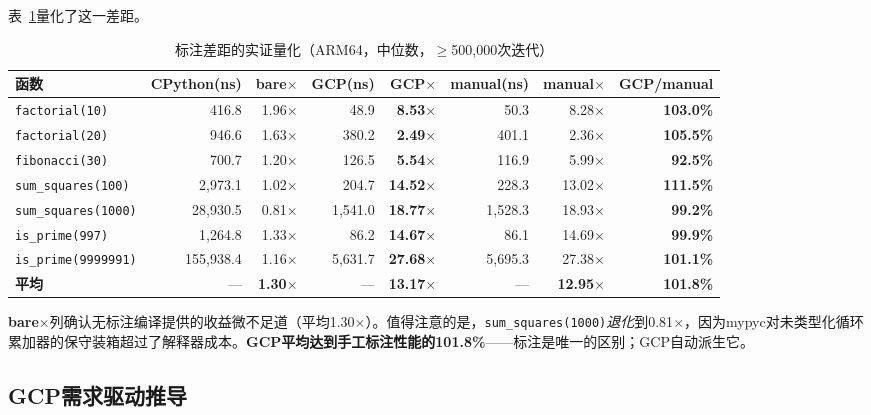 \documentclass[UTF8]{article}
\begin{document}
表~\ref{tab:annotation-gap}量化了这一差距。

\begin{table}[h]
\centering
\caption{标注差距的实证量化（ARM64，中位数，$\geq$500,000次迭代）}
\label{tab:annotation-gap}
\begin{tabular}{lrrrrrrr}
\toprule
\textbf{函数} & \textbf{CPython(ns)} & \textbf{bare$\times$} & \textbf{GCP(ns)} & \textbf{GCP$\times$} & \textbf{manual(ns)} & \textbf{manual$\times$} & \textbf{GCP/manual} \\
\midrule
\texttt{factorial(10)}    & 416.8   & 1.96$\times$ & 48.9   & \textbf{8.53$\times$}  & 50.3   & 8.28$\times$  & \textbf{103.0\%} \\
\texttt{factorial(20)}    & 946.6   & 1.63$\times$ & 380.2  & \textbf{2.49$\times$}  & 401.1  & 2.36$\times$  & \textbf{105.5\%} \\
\texttt{fibonacci(30)}    & 700.7   & 1.20$\times$ & 126.5  & \textbf{5.54$\times$}  & 116.9  & 5.99$\times$  & \textbf{92.5\%}  \\
\texttt{sum\_squares(100)}  & 2,973.1 & 1.02$\times$ & 204.7  & \textbf{14.52$\times$} & 228.3  & 13.02$\times$ & \textbf{111.5\%} \\
\texttt{sum\_squares(1000)} & 28,930.5& 0.81$\times$ & 1,541.0& \textbf{18.77$\times$} & 1,528.3& 18.93$\times$ & \textbf{99.2\%}  \\
\texttt{is\_prime(997)}     & 1,264.8 & 1.33$\times$ & 86.2   & \textbf{14.67$\times$} & 86.1   & 14.69$\times$ & \textbf{99.9\%}  \\
\texttt{is\_prime(9999991)} & 155,938.4& 1.16$\times$& 5,631.7& \textbf{27.68$\times$} & 5,695.3& 27.38$\times$ & \textbf{101.1\%} \\
\midrule
\textbf{平均} & --- & \textbf{1.30$\times$} & --- & \textbf{13.17$\times$} & --- & \textbf{12.95$\times$} & \textbf{101.8\%} \\
\bottomrule
\end{tabular}
\end{table}

\textbf{bare$\times$}列确认无标注编译提供的收益微不足道（平均1.30$\times$）。值得注意的是，\texttt{sum\_squares(1000)}\emph{退化}到0.81$\times$，因为mypyc对未类型化循环累加器的保守装箱超过了解释器成本。\textbf{GCP平均达到手工标注性能的101.8\%}——标注是唯一的区别；GCP自动派生它。

\subsection{GCP需求驱动推导}
\end{document}
